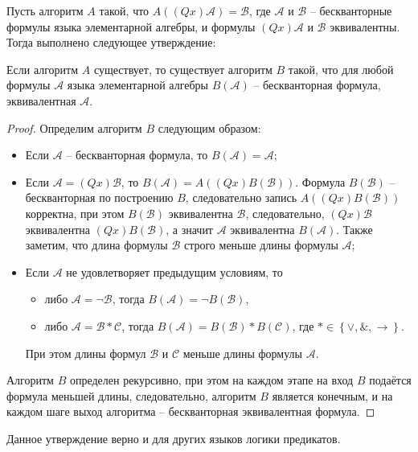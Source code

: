 Пусть алгоритм $A$ такой, что $A\left(\left(Qx\right)\mathcal{A}\right) = \mathcal{B}$, где $\mathcal{A}$ и $\mathcal{B}$ -- бескванторные формулы языка элементарной алгебры, и формулы $(Qx)\mathcal{A}$ и $\mathcal{B}$ эквивалентны. Тогда выполнено следующее утверждение:
\begin{proposal}
    Если алгоритм $A$ существует, то существует алгоритм $B$ такой, что для любой формулы $\mathcal{A}$ языка элементарной алгебры $B\left(\mathcal{A}\right)$ -- бескванторная формула, эквивалентная $\mathcal{A}$.
\end{proposal}   
\begin{proof}
    Определим алгоритм $B$ следующим образом:
    \begin{itemize}
        \item Если $\mathcal{A}$ -- бескванторная формула, то $B\left(\mathcal{A}\right) = \mathcal{A}$;
        \item Если $\mathcal{A} = \left(Qx\right)\mathcal{B}$, то $B\left(\mathcal{A}\right) = A\left(\left(Qx\right)B\left(\mathcal{B}\right)\right)$. Формула $B\left(\mathcal{B}\right)$ -- бескванторная по построению $B$, следовательно запись $A\left(\left(Qx\right)B\left(\mathcal{B}\right)\right)$ корректна, при этом $B\left(\mathcal{B}\right)$ эквивалентна $\mathcal{B}$, следовательно, $\left(Qx\right)\mathcal{B}$ эквивалентна $\left(Qx\right)B\left(\mathcal{B}\right)$, а значит $\mathcal{A}$ эквивалентна $B\left(\mathcal{A}\right)$. Также заметим, что длина формулы $\mathcal{B}$ строго меньше длины формулы $\mathcal{A}$;
        \item Если $\mathcal{A}$ не удовлетворяет предыдущим условиям, то
        \begin{itemize}
            \item либо $\mathcal{A} = \lnot \mathcal{B}$, тогда $B\left(\mathcal{A}\right) = \lnot B\left(\mathcal{B}\right)$,
            \item либо $\mathcal{A} = \mathcal{B} * \mathcal{C}$, тогда $B\left(\mathcal{A}\right) = B\left(\mathcal{B}\right) * B\left(\mathcal{C}\right)$, где $* \in \left\{\lor, \&, \to\right\}$.
        \end{itemize}
        При этом длины формул $\mathcal{B}$ и $\mathcal{C}$ меньше длины формулы $\mathcal{A}$.
    \end{itemize}
    Алгоритм $B$ определен рекурсивно, при этом на каждом этапе на вход $B$ подаётся формула меньшей длины, следовательно, алгоритм $B$ является конечным, и на каждом шаге выход алгоритма -- бескванторная эквивалентная формула.
\end{proof} 
\begin{remark}
    Данное утверждение верно и для других языков логики предикатов.
\end{remark}

